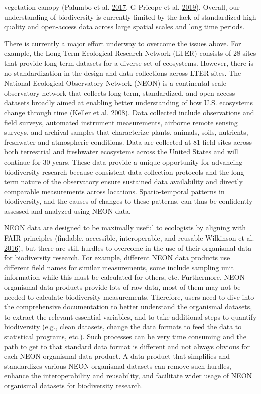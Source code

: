 \documentclass[
  12pt,
]{article}
\begin{document}
vegetation canopy (Palumbo et al. \protect\hyperlink{ref-palumbo2017building}{2017}, G Pricope et al. \protect\hyperlink{ref-g2019remote}{2019}). Overall, our understanding of biodiversity is currently limited by the lack of standardized high quality and open-access data across large spatial scales and long time periods.

There is currently a major effort underway to overcome the issues above. For example, the Long Term Ecological Research Network (LTER) consists of 28 sites that provide long term datasets for a diverse set of ecosystems. However, there is no standardization in the design and data collections across LTER sites. The National Ecological Observatory Network (NEON) is a continental-scale observatory network that collects long-term, standardized, and open access datasets broadly aimed at enabling better understanding of how U.S. ecosystems change through time (Keller et al. \protect\hyperlink{ref-keller2008continental}{2008}). Data collected include observations and field surveys, automated instrument measurements, airborne remote sensing surveys, and archival samples that characterize plants, animals, soils, nutrients, freshwater and atmospheric conditions. Data are collected at 81 field sites across both terrestrial and freshwater ecosystems across the United States and will continue for 30 years. These data provide a unique opportunity for advancing biodiversity research because consistent data collection protocols and the long-term nature of the observatory ensure sustained data availability and directly comparable measurements across locations. Spatio-temporal patterns in biodiversity, and the causes of changes to these patterns, can thus be confidently assessed and analyzed using NEON data.

NEON data are designed to be maximally useful to ecologists by aligning with FAIR principles (findable, accessible, interoperable, and reusable Wilkinson et al. \protect\hyperlink{ref-wilkinson2016fair}{2016}), but there are still hurdles to overcome in the use of their organismal data for biodiversity research. For example, different NEON data products use different field names for similar measurements, some include sampling unit information while this must be calculated for others, etc. Furthermore, NEON organismal data products provide lots of raw data, most of them may not be needed to calculate biodiversity measurements. Therefore, users need to dive into the comprehensive documentation to better understand the organismal datasets, to extract the relevant essential variables, and to take additional steps to quantify biodiversity (e.g., clean datasets, change the data formats to feed the data to statistical programs, etc.). Such processes can be very time consuming and the path to get to that standard data format is different and not always obvious for each NEON organismal data product. A data product that simplifies and standardizes various NEON organismal datasets can remove such hurdles, enhance the interoperability and reusability, and facilitate wider usage of NEON organismal datasets for biodiversity research.
\end{document}
